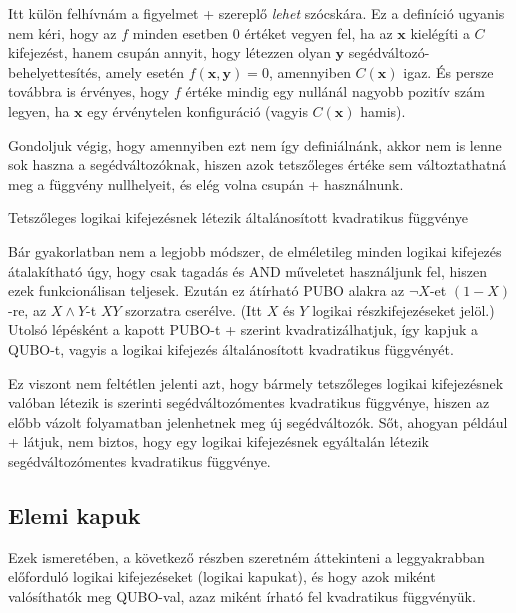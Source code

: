 Itt külön felhívnám a figyelmet \az+ szereplő \textit{lehet} szócskára.
Ez a definíció ugyanis nem kéri, hogy az $f$ minden esetben 0 értéket vegyen fel, ha az $\mathbf{x}$ kielégíti a $C$ kifejezést, hanem csupán annyit, hogy létezzen olyan $\mathbf{y}$ segédváltozó-behelyettesítés, amely esetén $f(\mathbf{x},\mathbf{y})=0$, amennyiben $C(\mathbf{x})$ igaz. És persze továbbra is érvényes, hogy $f$ értéke mindig egy nullánál nagyobb pozitív szám legyen, ha $\mathbf{x}$ egy érvénytelen konfiguráció (vagyis $C(\mathbf{x})$ hamis).

Gondoljuk végig, hogy amennyiben ezt nem így definiálnánk, akkor nem is lenne sok haszna a segédváltozóknak, hiszen azok tetszőleges értéke sem változtathatná meg a függvény nullhelyeit, és elég volna csupán \az+ használnunk.


\begin{allitas} \label{allitas:altkvadfunc}
	Tetszőleges logikai kifejezésnek létezik általánosított kvadratikus függvénye
	
	 Bár gyakorlatban nem a legjobb módszer, de elméletileg minden logikai kifejezés átalakítható úgy, hogy csak tagadás és AND műveletet használjunk fel, hiszen ezek funkcionálisan teljesek. Ezután ez átírható PUBO alakra az $\neg X$-et $(1-X)$-re, az $X \wedge Y$-t $XY$ szorzatra cserélve. (Itt $X$ és $Y$ logikai részkifejezéseket jelöl.) Utolsó lépésként a kapott PUBO-t \az+ szerint kvadratizálhatjuk, így kapjuk a QUBO-t, vagyis a logikai kifejezés általánosított kvadratikus függvényét.
\end{allitas}

 Ez viszont nem feltétlen jelenti azt, hogy bármely tetszőleges logikai kifejezésnek valóban létezik is  szerinti segédváltozómentes kvadratikus függvénye, hiszen az előbb vázolt folyamatban jelenhetnek meg új segédváltozók. Sőt, ahogyan például \az+ látjuk, nem biztos, hogy egy logikai kifejezésnek egyáltalán létezik segédváltozómentes kvadratikus függvénye.


\subsection{Elemi kapuk}\label{sec:theoryElementaryGates}

Ezek ismeretében, a következő részben szeretném áttekinteni a leggyakrabban előforduló logikai kifejezéseket (logikai kapukat), és hogy azok miként valósíthatók meg QUBO-val, azaz miként írható fel kvadratikus függvényük.


